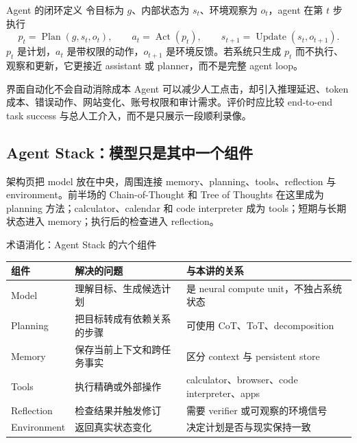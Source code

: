 \begin{importantbox}{Agent 的闭环定义}
令目标为 $g$、内部状态为 $s_t$、环境观察为 $o_t$，agent 在第 $t$ 步执行
\[
p_t=\operatorname{Plan}(g,s_t,o_t),\qquad
a_t=\operatorname{Act}(p_t),\qquad
s_{t+1}=\operatorname{Update}(s_t,o_{t+1}).
\]
$p_t$ 是计划，$a_t$ 是带权限的动作，$o_{t+1}$ 是环境反馈。若系统只生成 $p_t$ 而不执行、观察和更新，它更接近 assistant 或 planner，而不是完整 agent loop。
\end{importantbox}

\begin{warningbox}{界面自动化不会自动消除成本}
Agent 可以减少人工点击，却引入推理延迟、token 成本、错误动作、网站变化、账号权限和审计需求。评价时应比较 end-to-end task success 与总人工介入，而不是只展示一段顺利录像。
\end{warningbox}

\subsection{Agent Stack：模型只是其中一个组件}

架构页把 model 放在中央，周围连接 memory、planning、tools、reflection 与 environment。前半场的 Chain-of-Thought 和 Tree of Thoughts 在这里成为 planning 方法；calculator、calendar 和 code interpreter 成为 tools；短期与长期状态进入 memory；执行后的检查进入 reflection。


\begin{knowledgebox}{术语消化：Agent Stack 的六个组件}
\begin{tabularx}{\textwidth}{L{0.18\textwidth}>{\raggedright\arraybackslash}X >{\raggedright\arraybackslash}X}
\toprule
组件 & 解决的问题 & 与本讲的关系 \\
\midrule
Model & 理解目标、生成候选计划 & 是 neural compute unit，不独占系统状态 \\
Planning & 把目标转成有依赖关系的步骤 & 可使用 CoT、ToT、decomposition \\
Memory & 保存当前上下文和跨任务事实 & 区分 context 与 persistent store \\
Tools & 执行精确或外部操作 & calculator、browser、code interpreter、apps \\
Reflection & 检查结果并触发修订 & 需要 verifier 或可观察的环境信号 \\
Environment & 返回真实状态变化 & 决定计划是否与现实保持一致 \\
\bottomrule
\end{tabularx}
\end{knowledgebox}

